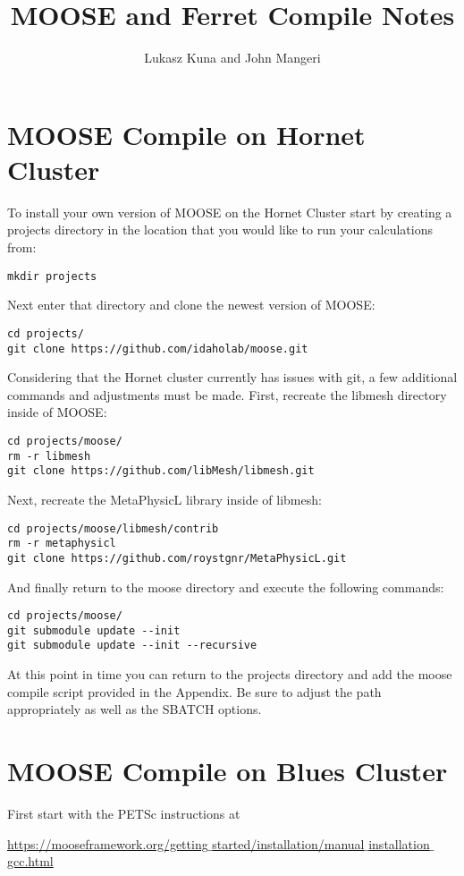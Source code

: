 \documentclass[a4paper]{article}
\title{MOOSE and Ferret Compile Notes}
\author{Lukasz Kuna and John Mangeri}
\begin{document}
\maketitle

\section{MOOSE Compile on Hornet Cluster}
To install your own version of MOOSE on the Hornet Cluster start by creating a projects directory in the location that you would like to run your calculations from:
\begin{verbatim}
mkdir projects
\end{verbatim}
Next enter that directory and clone the newest version of MOOSE:
\begin{verbatim}
cd projects/
git clone https://github.com/idaholab/moose.git
\end{verbatim}
Considering that the Hornet cluster currently has issues with git, a few additional commands and adjustments must be made.  First, recreate the libmesh directory inside of MOOSE:
\begin{verbatim}
cd projects/moose/
rm -r libmesh
git clone https://github.com/libMesh/libmesh.git
\end{verbatim}
Next, recreate the MetaPhysicL library inside of libmesh:
\begin{verbatim}
cd projects/moose/libmesh/contrib
rm -r metaphysicl
git clone https://github.com/roystgnr/MetaPhysicL.git
\end{verbatim}
And finally return to the moose directory and execute the following commands:
\begin{verbatim}
cd projects/moose/
git submodule update --init
git submodule update --init --recursive
\end{verbatim}
At this point in time you can return to the projects directory and add the moose compile script provided in the Appendix.  Be sure to adjust the path appropriately as well as the SBATCH options.


\section{MOOSE Compile on Blues Cluster}

First start with the PETSc instructions at

\href{https://mooseframework.org/getting$\_$started/installation/manual$\_$installation$\_$gcc.html}{https://mooseframework.org/getting$\_$started/installation/manual$\_$installation$\_$gcc.html}
\end{document}
